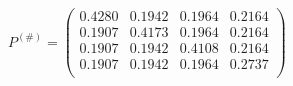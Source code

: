 \documentclass{standalone}
\begin{document}
	$P^{(\#)} = 
	\begin{pmatrix}
		0.4280  & 0.1942 & 0.1964 & 0.2164  \\
		0.1907  & 0.4173 & 0.1964 & 0.2164 \\
		0.1907  & 0.1942 & 0.4108 & 0.2164 \\
		0.1907  & 0.1942 & 0.1964 & 0.2737 \\
	\end{pmatrix}$
\end{document}
